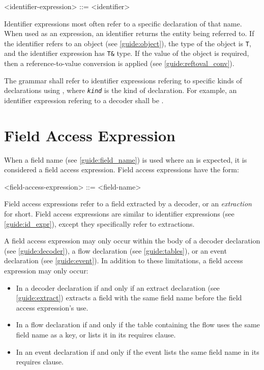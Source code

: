 \begin{minip}
\begin{grammar}
<identifier-expression> ::= <identifier>
\end{grammar}
\end{minip}

Identifier expressions most often refer to a specific declaration of that name. When used as an expression, an identifier returns the entity being referred to. If the identifier refers to an object (see \ref{guide:object}), the type of the object is \texttt{T}, and the identifier expression has \texttt{T\&} type. If the value of the object is required, then a reference-to-value conversion is applied (see \ref{guide:reftoval_conv}).

The grammar shall refer to identifier expressions refering to specific kinds of declarations using , where \texttt{\textit{kind}} is the kind of declaration. For example, an identifier expression refering to a decoder shall be .

\section{Field Access Expression} \label{guide:field_access_expr}

When a field name (see \ref{guide:field_name}) is used where an  is expected, it is considered a field access expression. Field access expressions have the form:

\begin{minip}
\begin{grammar}
<field-access-expression> ::= <field-name>
\end{grammar}
\end{minip}

Field access expressions refer to a field extracted by a decoder, or an \textit{extraction} for short. Field access expressions are similar to identifier expressions (see \ref{guide:id_expr}), except they specifically refer to extractions.

A field access expression may only occur within the body of a decoder declaration (see \ref{guide:decoder}), a flow declaration (see \ref{guide:tables}), or an event declaration (see \ref{guide:event}). In addition to these limitations, a field access expression may only occur:

\begin{itemize}
\item In a decoder declaration if and only if an extract declaration (see \ref{guide:extract}) extracts a field with the same field name before the field access expression's use.

\item In a flow declaration if and only if the table containing the flow uses the same field name as a key, or lists it in its requires clause.

\item In an event declaration if and only if the event lists the same field name in its requires clause.
\end{itemize}

